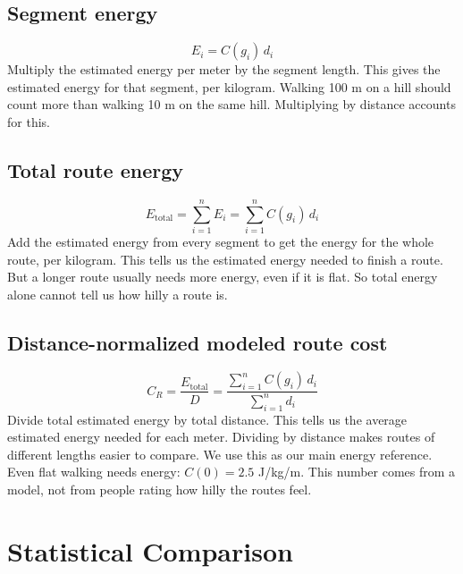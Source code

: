 \documentclass[11pt,letterpaper]{article}
\begin{document}
\subsection{Segment energy}
\begin{equation}\boxed{E_i=C(g_i)\,d_i}\end{equation}
Multiply the estimated energy per meter by the segment length. This gives the estimated energy for that segment, per kilogram. Walking 100 m on a hill should count more than walking 10 m on the same hill. Multiplying by distance accounts for this.

\subsection{Total route energy}
\begin{equation}\boxed{E_{\mathrm{total}}=\sum_{i=1}^{n}E_i=\sum_{i=1}^{n}C(g_i)\,d_i}\end{equation}
Add the estimated energy from every segment to get the energy for the whole route, per kilogram. This tells us the estimated energy needed to finish a route. But a longer route usually needs more energy, even if it is flat. So total energy alone cannot tell us how hilly a route is.

\subsection{Distance-normalized modeled route cost}
\begin{equation}\boxed{C_R=\frac{E_{\mathrm{total}}}{D}=\frac{\displaystyle\sum_{i=1}^{n}C(g_i)\,d_i}{\displaystyle\sum_{i=1}^{n}d_i}}\end{equation}
Divide total estimated energy by total distance. This tells us the average estimated energy needed for each meter. Dividing by distance makes routes of different lengths easier to compare. We use this as our main energy reference. Even flat walking needs energy: $C(0)=2.5$ J/kg/m. This number comes from a model, not from people rating how hilly the routes feel.

\section{Statistical Comparison}
\end{document}
